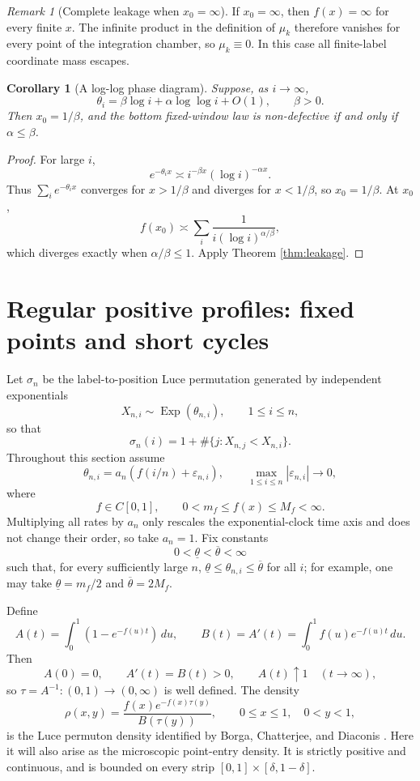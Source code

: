 \documentclass[11pt]{article}
\newtheorem{corollary}[theorem]{Corollary}
\theoremstyle{remark}
\newtheorem{remark}[theorem]{Remark}
\newcommand{\Exp}{\operatorname{Exp}}
\newcommand{\dd}{\,d}
\newcommand{\eps}{\varepsilon}
\begin{document}
\begin{remark}[Complete leakage when $x_0=\infty$]
If $x_0=\infty$, then $f(x)=\infty$ for every finite $x$.  The infinite
product in the definition of $\mu_k$ therefore vanishes for every point of the
integration chamber, so $\mu_k\equiv0$.  In this case all finite-label
coordinate mass escapes.
\end{remark}

\begin{corollary}[A log-log phase diagram]\label{cor:loglog}
Suppose, as $i\to\infty$,
\[
        \theta_i=\beta\log i+\alpha\log\log i+O(1),
        \qquad \beta>0.
\]
Then \(x_0=1/\beta\), and the bottom fixed-window law is non-defective if and only if \(\alpha\le\beta\).
\end{corollary}

\begin{proof}
For large \(i\),
\[
        e^{-\theta_i x}\asymp i^{-\beta x}(\log i)^{-\alpha x}.
\]
Thus \(\sum_i e^{-\theta_i x}\) converges for \(x>1/\beta\) and diverges for \(x<1/\beta\), so \(x_0=1/\beta\).  At \(x_0\),
\[
        f(x_0)\asymp \sum_i\frac{1}{i(\log i)^{\alpha/\beta}},
\]
which diverges exactly when \(\alpha/\beta\le1\).  Apply Theorem \ref{thm:leakage}.
\end{proof}

\section{Regular positive profiles: fixed points and short cycles}\label{sec:regular}

Let \(\sigma_n\) be the label-to-position Luce permutation generated by independent exponentials
\[
        X_{n,i}\sim \Exp(\theta_{n,i}),\qquad 1\le i\le n,
\]
so that
\[
        \sigma_n(i)=1+\#\{j:X_{n,j}<X_{n,i}\}.
\]
Throughout this section assume
\[
        \theta_{n,i}=a_n(f(i/n)+\eps_{n,i}),
        \qquad \max_{1\le i\le n}|\eps_{n,i}|\to0,
\]
where
\[
        f\in C[0,1],\qquad 0<m_f\le f(x)\le M_f<\infty.
\]
Multiplying all rates by \(a_n\) only rescales the exponential-clock time axis
and does not change their order, so take \(a_n=1\).  Fix constants
\[
        0<\underline\theta<\overline\theta<\infty
\]
such that, for every sufficiently large $n$,
$\underline\theta\le\theta_{n,i}\le\overline\theta$ for all $i$; for
example, one may take $\underline\theta=m_f/2$ and
$\overline\theta=2M_f$.

Define
\[
        A(t)=\int_0^1(1-e^{-f(u)t})\dd u,
        \qquad
        B(t)=A'(t)=\int_0^1 f(u)e^{-f(u)t}\dd u.
\]
Then
\[
        A(0)=0,\qquad A'(t)=B(t)>0,\qquad A(t)\uparrow1
        \quad(t\to\infty),
\]
so $\tau=A^{-1}:(0,1)\to(0,\infty)$ is well defined.  The density
\[
        \rho(x,y)=\frac{f(x)e^{-f(x)\tau(y)}}{B(\tau(y))},
        \qquad 0\le x\le1,\quad 0<y<1,
\]
is the Luce permuton density identified by Borga, Chatterjee, and Diaconis
\cite[Proposition~2.2]{BCD2025}.  Here it will also arise as the microscopic
point-entry density.  It is strictly positive and continuous, and is bounded
on every strip $[0,1]\times[\delta,1-\delta]$.
\end{document}

